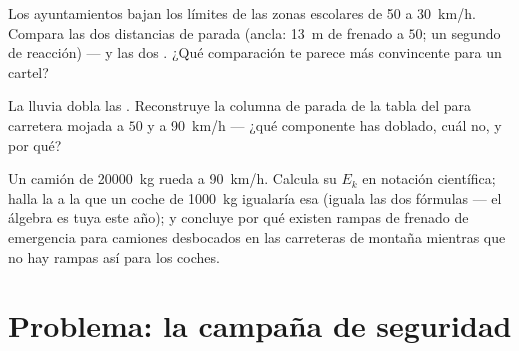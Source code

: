 \begin{exercise}[$\star\star$]\label{exo:g9:kinetic-energy-safety:10}
Los ayuntamientos bajan los límites de las zonas escolares de
\qty{50}{} a \qty{30}{km/h}. Compara las dos distancias de parada
(ancla: \qty{13}{m} de frenado a $50$; un segundo de reacción) --- y las
dos . ¿Qué comparación te parece más convincente para
un cartel?
\end{exercise}

\begin{exercise}[$\star\star$]\label{exo:g9:kinetic-energy-safety:11}
La lluvia dobla las . Reconstruye la columna
de parada de la tabla del  para carretera mojada a $50$ y a
\qty{90}{km/h} --- ¿qué componente has doblado, cuál no, y por qué?
\end{exercise}

\begin{exercise}[$\star\star\star$]\label{exo:g9:kinetic-energy-safety:12}
Un camión de \qty{20000}{kg} rueda a \qty{90}{km/h}. Calcula su $E_k$
en notación científica; halla la  a la que un coche de
\qty{1000}{kg} igualaría esa  (iguala las dos fórmulas ---
el álgebra es tuya este año); y concluye por qué existen rampas de
frenado de emergencia para camiones desbocados en las carreteras de
montaña mientras que no hay rampas así para los coches.
\end{exercise}

\section{Problema: la campaña de seguridad}


